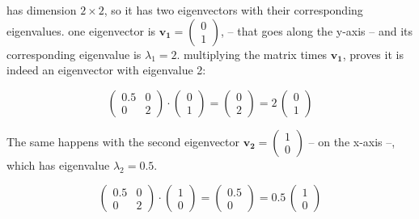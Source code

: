 \documentclass[12pt]{article}
\begin{document}
has dimension $2 \times 2$, so it has two eigenvectors with their corresponding eigenvalues. one eigenvector is $\mathbf{v_1}=\begin{pmatrix}  0\\ 1 \end{pmatrix} $,  -- that goes along the y-axis -- and its corresponding eigenvalue is $\lambda_1 = 2$. multiplying the matrix times $\mathbf{v_1}$, proves it is indeed an eigenvector with eigenvalue 2:

\begin{equation}
	\begin{pmatrix} 0.5 & 0\\ 0 &  2 \end{pmatrix} \cdot \begin{pmatrix}  0\\ 1 \end{pmatrix} = \begin{pmatrix}  0\\ 2 \end{pmatrix}= 2 \, \begin{pmatrix}  0\\ 1 \end{pmatrix}
\end{equation}

The same happens with the second eigenvector $\mathbf{v_2}=\begin{pmatrix}  1\\ 0 \end{pmatrix}$ -- on the x-axis --, which has eigenvalue $\lambda_2 = 0.5$.

\begin{equation}
	\begin{pmatrix} 0.5 & 0\\ 0 &  2 \end{pmatrix} \cdot \begin{pmatrix}  1\\ 0 \end{pmatrix} = \begin{pmatrix}  0.5\\ 0 \end{pmatrix}= 0.5 \, \begin{pmatrix}  1\\ 0 \end{pmatrix}
\end{equation}
\end{document}
